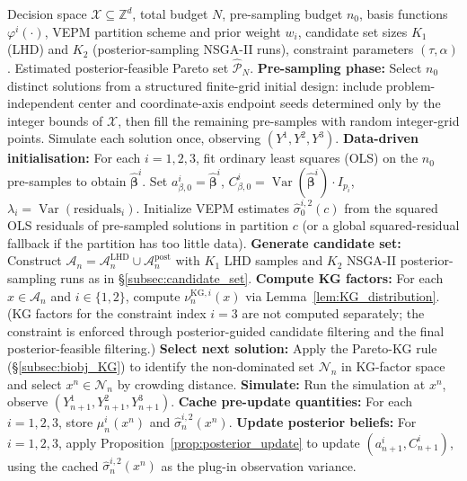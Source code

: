 \documentclass[12pt]{article}
\theoremstyle{plain}
\theoremstyle{definition}
\theoremstyle{remark}
\DeclareMathOperator{\Var}{Var}
\begin{document}
\begin{algorithm}[ht]
\caption{GPR-KG: Parametric GPR with Knowledge Gradient for Bi-Objective Constrained Simulation Optimization}\label{alg:GPR_KG}
\begin{algorithmic}[1]
\Require Decision space $\mathcal{X} \subseteq \mathbb{Z}^d$, total budget $N$, pre-sampling budget $n_0$, basis functions $\varphi^i(\cdot)$, VEPM partition scheme and prior weight $w_i$, candidate set sizes $K_1$ (LHD) and $K_2$ (posterior-sampling NSGA-II runs), constraint parameters $(\tau, \alpha)$.
\Ensure Estimated posterior-feasible Pareto set $\hat{\mathcal{P}}_N$.
\State \textbf{Pre-sampling phase:} Select $n_0$ distinct solutions from a structured finite-grid initial design: include problem-independent center and coordinate-axis endpoint seeds determined only by the integer bounds of $\mathcal{X}$, then fill the remaining pre-samples with random integer-grid points. Simulate each solution once, observing $(Y^1, Y^2, Y^3)$.
\State \textbf{Data-driven initialisation:} For each $i=1,2,3$, fit ordinary least squares (OLS) on the $n_0$ pre-samples to obtain $\hat{\boldsymbol{\beta}}^i$. Set $a^i_{\beta,0}=\hat{\boldsymbol{\beta}}^i$, $C^i_{\beta,0}=\Var(\hat{\boldsymbol{\beta}}^i)\cdot I_{p_i}$, $\lambda_i=\Var(\text{residuals}_i)$. Initialize VEPM estimates $\hat{\sigma}^{i,2}_0(c)$ from the squared OLS residuals of pre-sampled solutions in partition $c$ (or a global squared-residual fallback if the partition has too little data).
  \State \textbf{Generate candidate set:} Construct $\mathcal{A}_n = \mathcal{A}_n^{\mathrm{LHD}} \cup \mathcal{A}_n^{\mathrm{post}}$ with $K_1$ LHD samples and $K_2$ NSGA-II posterior-sampling runs as in \S\ref{subsec:candidate_set}.
  \State \textbf{Compute KG factors:} For each $x \in \mathcal{A}_n$ and $i \in \{1,2\}$, compute $\nu^{\mathrm{KG},i}_n(x)$ via Lemma~\ref{lem:KG_distribution}. (KG factors for the constraint index $i=3$ are not computed separately; the constraint is enforced through posterior-guided candidate filtering and the final posterior-feasible filtering.)
  \State \textbf{Select next solution:} Apply the Pareto-KG rule (\S\ref{subsec:biobj_KG}) to identify the non-dominated set $\mathcal{N}_n$ in KG-factor space and select $x^n \in \mathcal{N}_n$ by crowding distance.
  \State \textbf{Simulate:} Run the simulation at $x^n$, observe $(Y^1_{n+1}, Y^2_{n+1}, Y^3_{n+1})$.
  \State \textbf{Cache pre-update quantities:} For each $i=1,2,3$, store $\mu^i_n(x^n)$ and $\hat{\sigma}^{i,2}_n(x^n)$.
  \State \textbf{Update posterior beliefs:} For $i = 1,2,3$, apply Proposition~\ref{prop:posterior_update} to update $(a^i_{n+1}, C^i_{n+1})$, using the cached $\hat{\sigma}^{i,2}_n(x^n)$ as the plug-in observation variance.

\end{algorithmic}
\end{algorithm}
\end{document}

